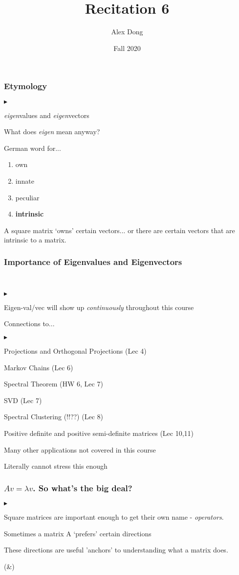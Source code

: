 \documentclass{beamer}
\title{Recitation 6}
\author{Alex Dong}
\institute{CDS, NYU}
\date{Fall 2020}
\renewenvironment{itemize}
\renewenvironment{enumerate}%
{\begin{list}{\arabic{enumi}.}%
      {\setlength{\leftmargin}{2.5em}%
       \setlength{\itemsep}{-\parsep}%
       \setlength{\topsep}{-\parskip}%
       \usecounter{enumi}}%
 }{\end{list}}
\renewenvironment{itemize}%
{\begin{list}{$\blacktriangleright$}%
      {\setlength{\leftmargin}{2.5em}%
       \setlength{\itemsep}{-\parsep}%
       \setlength{\topsep}{-\parskip}%
       \usecounter{enumi}}%
 }{\end{list}}
\begin{document}
\frame{\titlepage} 

\begin{frame}
\frametitle{Etymology}

\begin{itemize}
\item \textit{eigen}values and \textit{eigen}vectors
\item What does \textit{eigen} mean anyway?
\item German word for...
\begin{enumerate}
\item own
\item innate
\item peculiar
\item \textbf{intrinsic}
\end{enumerate}
\item A square matrix `owns' certain vectors... or there are certain vectors that are intrinsic to a matrix.
\end{itemize}
\end{frame}

\begin{frame}
\frametitle{Importance of Eigenvalues and Eigenvectors}
\\
\bigskip
\begin{itemize}
\item Eigen-val/vec will show up \textit{continuously} throughout this course
\item Connections to...
\begin{itemize}
\item Projections and Orthogonal Projections (Lec 4)
\item Markov Chains (Lec 6)
\item Spectral Theorem (HW 6, Lec 7)
\item SVD (Lec 7)
\item Spectral Clustering (!!??) (Lec 8)
\item Positive definite and positive semi-definite matrices (Lec 10,11)
\end{itemize}
\item Many other applications not covered in this course
\item Literally cannot stress this enough

\end{itemize}
\end{frame}


\begin{frame}
\frametitle{$Av=\lambda v$. So what's the big deal?}
\begin{itemize}
\item Square matrices are important enough to get their own name - \textit{operators}.
\item Sometimes a matrix A `prefers' certain directions
\item These directions are useful 'anchors' to understanding what a matrix does.
\item (&)
\end{itemize}



\end{frame}
\end{document}
